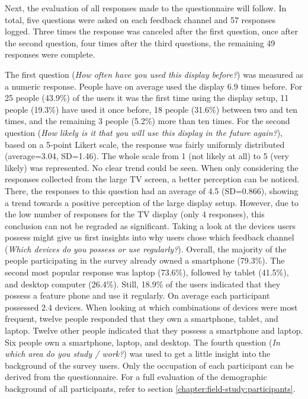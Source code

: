	Next, the evaluation of all responses made to the questionnaire will follow. In total, five questions were asked on each feedback channel and 57 responses logged. Three times the response was canceled after the first question, once after the second question, four times after the third questions, the remaining 49 responses were complete.

	The first question (\textit{How often have you used this display before?}) was measured as a numeric response. People have on average used the display 6.9 times before. For 25 people (43.9\%) of the users it was the first time using the display setup, 11 people (19.3\%) have used it once before, 18 people (31.6\%) between two and ten times, and the remaining 3 people (5.2\%) more than ten times.
	For the second question (\textit{How likely is it that you will use this display in the future again?}), based on a 5-point Likert scale, the response was fairly uniformly distributed (average=3.04, SD=1.46). The whole scale from 1 (not likely at all) to 5 (very likely) was represented. No clear trend could be seen. When only considering the responses collected from the large TV screen, a better perception can be noticed. There, the responses to this question had an average of 4.5 (SD=0.866), showing a trend towards a positive perception of the large display setup. However, due to the low number of responses for the TV display (only 4 responses), this conclusion can not be regraded as significant. 
	Taking a look at the devices users possess might give us first insights into why users chose which feedback channel (\textit{Which devices do you possess or use regularly?}). Overall, the majority of the people participating in the survey already owned a smartphone (79.3\%). The second most popular response was laptop (73.6\%), followed by tablet (41.5\%), and desktop computer (26.4\%). Still, 18.9\% of the users indicated that they possess a feature phone and use it regularly. On average each participant possessed 2.4 devices. 
	When looking at which combinations of devices were most frequent, twelve people responded that they own a smartphone, tablet, and laptop. Twelve other people indicated that they possess a smartphone and laptop. Six people own a smartphone, laptop, and desktop.
	The fourth question (\textit{In which area do you study / work?}) was used to get a little insight into the background of the survey users. Only the occupation of each participant can be derived from the questionnaire. For a full evaluation of the demographic background of all participants, refer to section \ref{chapter:field-study:participants}.
